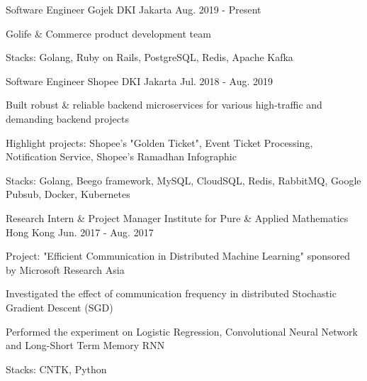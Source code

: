 

\begin{cventries}

  \cventry
    {Software Engineer} %
    {Gojek} %
    {DKI Jakarta} %
    {Aug. 2019 - Present} %
    {
      \begin{cvitems} %
        \item {Golife \& Commerce product development team}
        \item {Stacks: Golang, Ruby on Rails, PostgreSQL, Redis, Apache Kafka}
      \end{cvitems}
    }

  \cventry
    {Software Engineer} %
    {Shopee} %
    {DKI Jakarta} %
    {Jul. 2018 - Aug. 2019} %
    {
      \begin{cvitems} %
        \item {Built robust \& reliable backend microservices for various high-traffic and demanding backend projects}
        \item {Highlight projects: Shopee's "Golden Ticket", Event Ticket Processing, Notification Service, Shopee's Ramadhan Infographic}
        \item {Stacks: Golang, Beego framework, MySQL, CloudSQL, Redis, RabbitMQ, Google Pubsub, Docker, Kubernetes}
      \end{cvitems}
    }



  \cventry
    {Research Intern \& Project Manager} %
    {Institute for Pure \& Applied Mathematics} %
    {Hong Kong} %
    {Jun. 2017 - Aug. 2017} %
    {
      \begin{cvitems} %
        \item {Project: "Efficient Communication in Distributed Machine Learning" sponsored by Microsoft Research Asia}
        \item {Investigated the effect of communication frequency in distributed Stochastic Gradient Descent (SGD)}
        \item {Performed the experiment on Logistic Regression, Convolutional Neural Network and Long-Short Term Memory RNN}
        \item {Stacks: CNTK, Python}
      \end{cvitems}
    }


\end{cventries}
